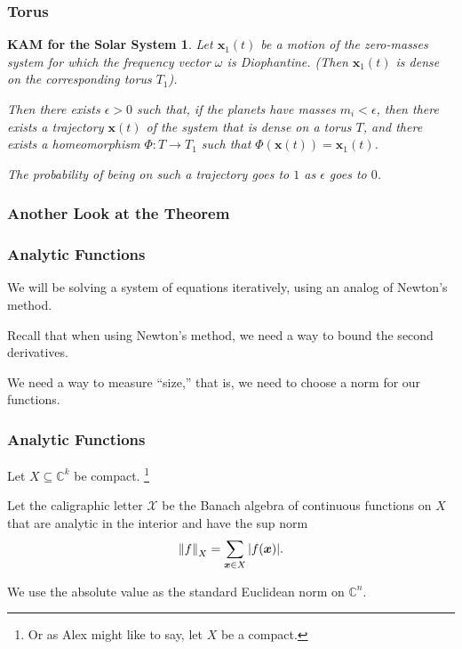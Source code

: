 \documentclass{beamer}
\newcommand{\C}{\mathbb{C}}
\newcommand{\bp}[1]{\bm{#1}}
\newcommand{\genericdel}[4]{%
  \ifcase#3\relax
  #1#4#2\or
  \bigl#1#4\bigr#2\or
  \Bigl#1#4\Bigr#2\or
  \biggl#1#4\biggr#2\or
  \Biggl#1#4\Biggr#2\else
  \left#1#4\right#2\fi
}
\newcommand{\enVert}[2][-1]{\genericdel\|\|{#1}{#2}}
\let\norm\enVert
\begin{document}
\begin{frame}
  \frametitle{Torus}
  \newtheorem{kamsolar}{KAM for the Solar System}
  \begin{kamsolar}
    Let $\bp{x}_1(t)$ be a motion of the zero-masses system for which the
    frequency vector $\omega$ is Diophantine.
    (Then $\bp{x}_1(t)$ is dense on the corresponding torus $T_1$).

    Then there exists $\epsilon > 0$ such that, if the planets have masses $m_i
    < \epsilon$, then there exists a trajectory $\bp{x}(t)$ of the system that
    is dense on a torus $T$, and there exists a homeomorphism $\Phi : T \to T_1$
    such that $\Phi(\bp{x}(t)) = \bp{x}_1(t)$.

    The probability of being on such a trajectory goes to $1$ as $\epsilon$ goes
    to $0$.
  \end{kamsolar}
\end{frame}

\begin{frame}
  \frametitle{Another Look at the Theorem}
  \begin{kamthm}
    \KAM{}
  \end{kamthm}
\end{frame}

\begin{frame}
  \frametitle{Analytic Functions}

  We will be solving a system of equations iteratively, using an analog of
  Newton's method.
  
  Recall that when using Newton's method, we need a way to bound the second
  derivatives.
  
  We need a way to measure ``size,'' that is, we need to choose a norm for our
  functions.

\end{frame}

\begin{frame}
  \frametitle{Analytic Functions}
  Let $X \subseteq \C^k$ be compact.
  \footnote{ Or as Alex might like to say, let $X$ be a compact.}

  Let the caligraphic letter $\mathcal{X}$ be the Banach algebra of continuous
  functions on $X$ that are analytic in the interior and have the sup norm
  \begin{equation*}
    \norm{f}_X = \sum_{\bp{x} \in X} |f(\bp{x})|.
  \end{equation*}

  We use the absolute value as the standard Euclidean norm on $\C^n$.
\end{frame}
\end{document}

